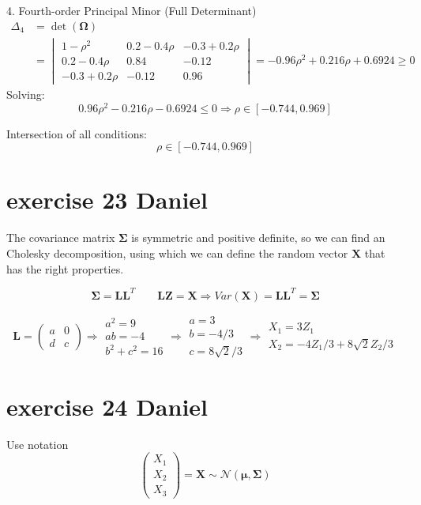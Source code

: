 \documentclass{article}
\let\normalmu\mu
\let\normalSigma\Sigma
\renewcommand{\mu}{\bm{\normalmu}} %
\renewcommand{\Sigma}{\bm{\normalSigma}} %
\begin{document}
4. Fourth-order Principal Minor (Full Determinant)
\begin{align*}
\Delta_4 &= \det(\bm{\Omega}) \\
&=\begin{vmatrix}
1-\rho^2 & 0.2-0.4\rho & -0.3+0.2\rho \\
0.2-0.4\rho & 0.84 & -0.12 \\
-0.3+0.2\rho & -0.12 & 0.96
\end{vmatrix} 
=-0.96\rho^2 + 0.216\rho + 0.6924 \geq 0
\end{align*}
Solving:
\[
0.96\rho^2 - 0.216\rho - 0.6924 \leq 0 \Rightarrow \rho \in [-0.744, 0.969]
\]

Intersection of all conditions:
\[
\rho \in [-0.744, 0.969]
\]

\section{exercise 23 Daniel}
The covariance matrix $\mathbf{\Sigma}$ is symmetric and positive definite,
so we can find an Cholesky decomposition,
using which we can define the random vector $\mathbf{X}$ that has the right properties.

\[{\mathbf{\Sigma }} = {\mathbf{L}}{{\mathbf{L}}^T}\qquad {\mathbf{LZ}} = {\mathbf{X}} \Rightarrow Var\left( {\mathbf{X}} \right) = {\mathbf{L}}{{\mathbf{L}}^T} = {\mathbf{\Sigma }}\]

\[{\mathbf{L}} = \left( {\begin{array}{*{20}{c}}
            a & 0 \\
            d & c
        \end{array}} \right) \Rightarrow \begin{array}{*{20}{c}}
        {{a^2} = 9} \\
        {ab =  - 4} \\
        {{b^2} + {c^2} = 16}
    \end{array} \Rightarrow \begin{array}{*{20}{c}}
        {a = 3}      \\
        {b =  - 4/3} \\
        {c = 8\sqrt 2 /3}
    \end{array} \Rightarrow \begin{array}{*{20}{c}}
        {{X_1} = 3{Z_1}} \\
        {{X_2} =  - 4{Z_1}/3 + 8\sqrt 2 {Z_2}/3}
    \end{array}
\]

\section{exercise 24 Daniel}
Use notation
\[\left( {\begin{array}{*{20}{c}}
            {{X_1}} \\
            {{X_2}} \\
            {{X_3}}
        \end{array}} \right) = {\mathbf{X}}\sim\mathcal{N}\left( {{\mathbf{\mu }},{\mathbf{\Sigma }}} \right)\]
\end{document}
